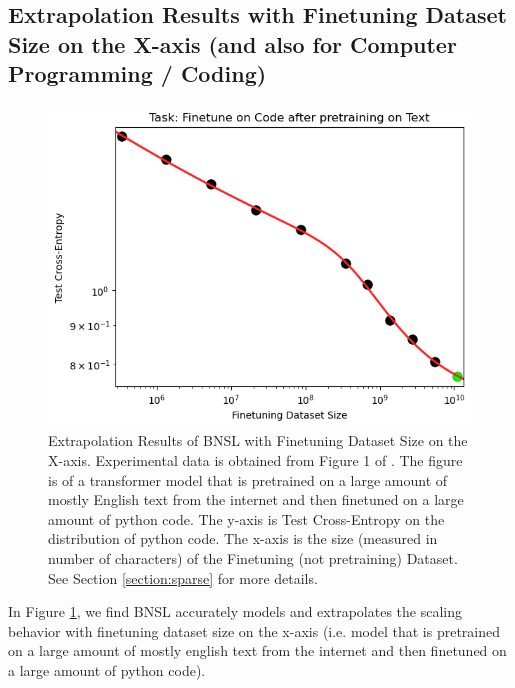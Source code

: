 \documentclass{article} %
\begin{document}
\subsection{Extrapolation Results with Finetuning Dataset Size on the X-axis (and also for Computer Programming / Coding)}
\label{section:finetuning}

\begin{figure}[htbp]
    \centering
\includegraphics[width=1.0\textwidth]{figures/finetuning/language_code_finetuning.png}
    \caption{
Extrapolation Results of BNSL with Finetuning Dataset Size on the X-axis. Experimental data is obtained from Figure 1 of \cite{2021arXiv210201293H}. The figure is of a transformer model that is pretrained on a large amount of mostly English text from the internet and then finetuned on a large amount of python code. The y-axis is Test Cross-Entropy on the distribution of python code. The x-axis is the size (measured in number of characters) of the Finetuning (not pretraining) Dataset. See Section \ref{section:sparse} for more details.
    }
    \label{fig:finetuning}
\end{figure}

In Figure \ref{fig:finetuning}, we find BNSL accurately models and extrapolates the scaling behavior with finetuning dataset size on the x-axis (i.e. model that is pretrained on a large amount of mostly english text from the internet and then finetuned on a large amount of python code).

\clearpage
\end{document}
